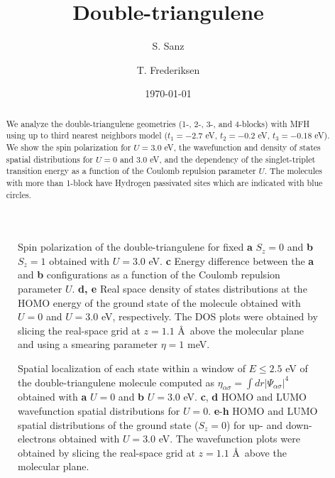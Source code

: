 \documentclass[twocolumn,amsmath,%
amssymb,prb,superscriptaddress]{revtex4}
\begin{document}
\title{Double-triangulene}

\author{S. Sanz}

\author{T. Frederiksen}

\date{\today}

\begin{abstract}
We analyze the double-triangulene geometries (1-, 2-, 3-, and 4-blocks) with MFH using up to third nearest neighbors model ($t_{1}=-2.7$ eV, $t_{2}=-0.2$ eV, $t_{3}=-0.18$ eV). We show the spin polarization for $ U=3.0$ eV, the wavefunction and density of states spatial distributions for $U=0$ and $3.0$ eV, and the dependency of the singlet-triplet transition energy as a function of the Coulomb repulsion parameter $U$. The molecules with more than 1-block have Hydrogen passivated sites which are indicated with blue circles.
\end{abstract}

\maketitle

\begin{figure*}
	\scalebox{.8}{}
	\caption{Spin polarization of the double-triangulene for fixed \textbf{a} $S_{z}=0$ and \textbf{b} $S_{z}=1$ obtained with $U=3.0$ eV. \textbf{c} Energy difference between the \textbf{a} and \textbf{b} configurations as a function of the Coulomb repulsion parameter $U$.  \textbf{d, e} Real space density of states distributions at the HOMO energy of the ground state of the molecule obtained with $U=0$ and $U=3.0$ eV, respectively. The DOS plots were obtained by slicing the real-space grid at $z=1.1$ \AA \ above the molecular plane and using a smearing parameter $\eta=1$ meV.}
\end{figure*}


\begin{figure*}
	\scalebox{.8}{}
	\caption{Spatial localization of each state within a window of $E\leqslant 2.5$ eV of the double-triangulene molecule computed as $\eta_{\alpha\sigma} = \int dr |\Psi_{\alpha\sigma}|^{4}$ obtained with \textbf{a} $U=0$ and \textbf{b} $U=3.0$ eV. \textbf{c}, \textbf{d} HOMO and LUMO wavefunction spatial distributions for $U = 0$. \textbf{e}-\textbf{h} HOMO and LUMO spatial distributions of the ground state ($S_{z} = 0$) for up- and down-electrons obtained with $U=3.0$ eV. The wavefunction
plots were obtained by slicing the real-space grid at $z=1.1$ \AA \ above the molecular plane.}
\end{figure*}
\end{document}
